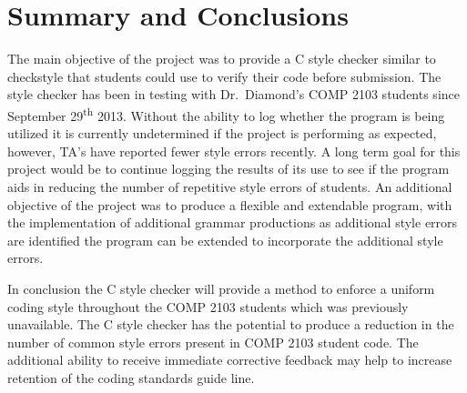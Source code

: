 \chapter{Summary and Conclusions}
\label{chap:SUMMARY}


The main objective of the project was to provide a C style checker similar to 
checkstyle that students could use to verify their code before submission. The 
style checker has been in testing with Dr.~Diamond's COMP 2103 students since 
September 29\textsuperscript{th} 2013. Without the ability to log whether the 
program is being utilized it is currently undetermined if the project is 
performing as expected, however, TA's have reported fewer style errors 
recently. A long term goal for this project would be to continue logging the 
results of its use to see if the program aids in reducing the number of 
repetitive style errors of students. An additional objective of the project was
to produce a flexible and extendable program, with the implementation of additional 
grammar productions as additional style errors are identified the program can 
be extended to incorporate the additional style errors.

In conclusion the C style checker will provide a method to enforce a uniform 
coding style throughout the COMP 2103 students which was previously unavailable.
The C style checker has the potential to produce a reduction in the number of 
common style errors present in COMP 2103 student code. The additional ability 
to receive immediate corrective feedback may help to increase retention of the 
coding standards guide line.
